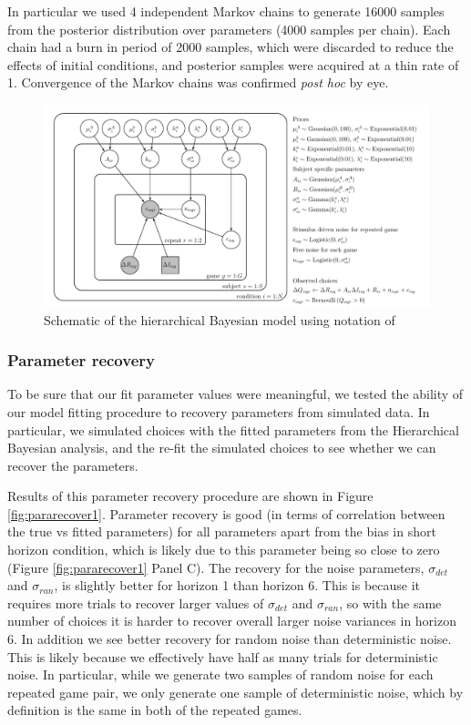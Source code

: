 \documentclass[12pt]{article}
\begin{document}
	In particular we used 4 independent Markov chains to generate 16000 samples from the posterior distribution over parameters (4000 samples per chain).  Each chain had a burn in period of 2000 samples, which were discarded to reduce the effects of initial conditions, and posterior samples were acquired at a thin rate of 1.  Convergence of the Markov chains was confirmed {\it post hoc} by eye. 
	
	\begin{figure}[H]
		\begin{center}
			\includegraphics[width=1\textwidth]{figures/Siyu_EEHorizon_2sigma_final.pdf}
    			\caption{Schematic of the hierarchical Bayesian model using notation of \cite{lee_wagenmakers_2014}}
			\label{fig:model}
		\end{center}
	\end{figure}
	
	\subsubsection*{Parameter recovery\label{ch:appendix:bayesrecovery}}
	
	To be sure that our fit parameter values were meaningful, we tested the ability of our model fitting procedure to recovery parameters from simulated data.  In particular, we simulated choices with the fitted parameters from the Hierarchical Bayesian analysis, and the re-fit the simulated choices to see whether we can recover the parameters. 
	
	Results of this parameter recovery procedure are shown in Figure \ref{fig:pararecover1}. Parameter recovery is good (in terms of correlation between the true vs fitted parameters) for all parameters apart from the bias in short horizon condition, which is likely due to this parameter being so close to zero (Figure \ref{fig:pararecover1} Panel C). The recovery for the noise parameters, $\sigma_{det}$ and $\sigma_{ran}$, is slightly better for horizon 1 than horizon 6. This is because it requires more trials to recover larger values of $\sigma_{det}$ and $\sigma_{ran}$, so with the same number of choices it is harder to recover overall larger noise variances in horizon 6. In addition we see better recovery for random noise than deterministic noise. This is likely because we effectively have half as many trials for deterministic noise. In particular, while we generate two samples of random noise for each repeated game pair, we only generate one sample of deterministic noise, which by definition is the same in both of the repeated games.
	
\end{document}
